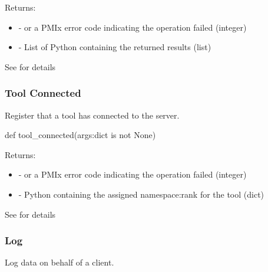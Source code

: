 Returns:
\begin{itemize}
    \item {} -  or a \ac{PMIx} error code indicating the operation failed (integer)
    \item {} - List of Python  containing the returned results (list)
\end{itemize}

See  for details


\subsubsection{Tool Connected}

\summary

Register that a tool has connected to the server.

\format

\pyspecificstart
\begin{codepar}
def tool_connected(args:dict is not None)
\end{codepar}
\pyspecificend

\begin{arglist}
\end{arglist}

Returns:
\begin{itemize}
    \item {} -  or a \ac{PMIx} error code indicating the operation failed (integer)
    \item {} - Python  containing the assigned namespace:rank for the tool (dict)
\end{itemize}

See  for details


\subsubsection{Log}

\summary

Log data on behalf of a client.


